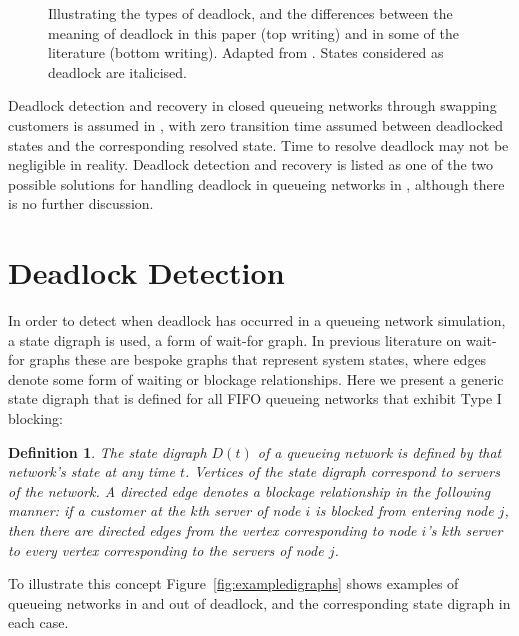 \documentclass{article}
\newtheorem{definition}{Definition}
\numberwithin{equation}{section}
\begin{document}
\begin{figure}[!htbp]
  \begin{center}
  
  \end{center}
  \caption{Illustrating the types of deadlock, and the differences between the
  meaning of deadlock in this paper (top writing) and in some of the
  literature (bottom writing). Adapted from \cite{venkateshetal98}.
  States considered as deadlock are italicised.}
  \label{fig:deadlocktypes}
\end{figure}

Deadlock detection and recovery in closed queueing networks through swapping
customers is assumed in \cite{perrosetal88}, with zero transition time assumed
between deadlocked states and the corresponding resolved state.
Time to resolve deadlock may not be negligible in reality.
Deadlock detection and recovery is listed as one of the two possible solutions
for handling deadlock in queueing networks in \cite{akyildiz89}, although
there is no further discussion.





\section{Deadlock Detection}\label{sec:detectingdeadlock}

In order to detect when deadlock has occurred in a queueing network
simulation, a state digraph is used, a form of wait-for graph.
In previous literature on wait-for graphs these are bespoke graphs that
represent system states, where edges denote some form of waiting or blockage
relationships.
Here we present a generic state digraph that is defined for all FIFO
queueing networks that exhibit Type I blocking:


\begin{definition}
The state digraph $D(t)$ of a queueing network is defined by that network's
state at any time $t$.
Vertices of the state digraph correspond to servers of the network.
A directed edge denotes a blockage relationship in the following manner: if a
customer at the $k$th server of node $i$ is blocked from entering node $j$,
then there are directed edges from the vertex corresponding to node $i$'s
$k$th server to every vertex corresponding to the servers of node $j$.
\end{definition}

To illustrate this concept Figure~\ref{fig:exampledigraphs} shows examples of
queueing networks in and out of deadlock, and the corresponding state digraph
in each case.
\end{document}
